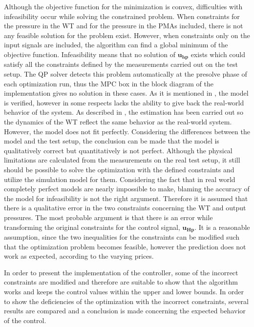Although the objective function for the minimization is convex, difficulties with infeasibility occur while solving the constrained problem. When constraints for the pressure in the WT and for the pressure in the PMAs included, there is not any feasible solution for the problem exist. However, when constraints only on the input signals are included, the algorithm can find a global minimum of the objective function. Infeasibility means that no solution of $\bm{u_{hp}}$ exists which could satisfy all the constraints defined by the measurements carried out on the test setup. The QP solver detects this problem automatically at the presolve phase of each optimization run, thus the MPC box in the block diagram of the implementation gives no solution in these cases. 
As it is mentioned in , the model is verified, however in some respects lacks the ability to give back the real-world behavior of the system. As described in , the estimation has been carried out so the dynamics of the WT reflect the same behavior as the real-world system. However, the model does not fit perfectly. Considering the differences between the model and the test setup, the conclusion can be made that the model is qualitatively correct but quantitatively is not perfect. Although the physical limitations are calculated from the measurements on the real test setup, it still should be possible to solve the optimization with the defined constraints and utilize the simulation model for them. Considering the fact that in real world completely perfect models are nearly impossible to make, blaming the accuracy of the model for infeasibility is not the right argument. Therefore it is assumed that there is a qualitative error in the two constraints concerning the WT and output pressures. The most probable argument is that there is an error while transforming the original constraints for the control signal, $\bm{u_{Hp}}$. It is a reasonable assumption, since the two inequalities for the constraints can be modified such that the optimization problem becomes feasible, however the prediction does not work as expected, according to the varying prices. 

In order to present the implementation of the controller, some of the incorrect constraints are modified and therefore are suitable to show that the algorithm works and keeps the control values within the upper and lower bounds. In order to show the deficiencies of the optimization with the incorrect constraints, several results are compared and a conclusion is made concerning the expected behavior of the control. 

